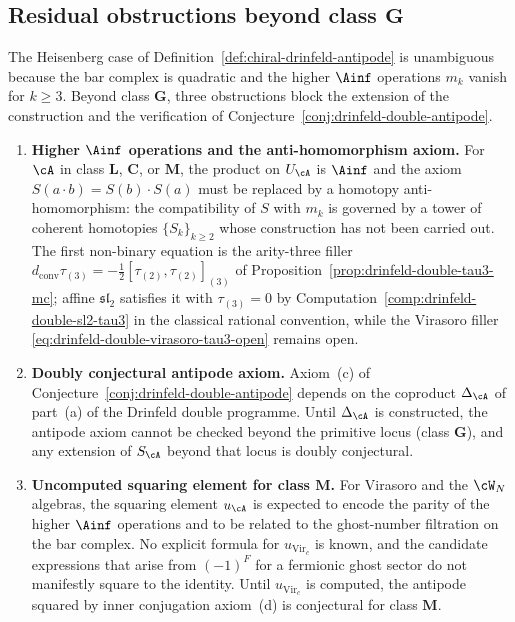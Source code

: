 \subsection{Residual obstructions beyond class $\mathbf{G}$}
\label{subsec:antipode-obstructions}

The Heisenberg case of Definition~\ref{def:chiral-drinfeld-antipode}
is unambiguous because the bar complex is quadratic and the higher
$\Ainf$ operations $m_k$ vanish for $k \ge 3$. Beyond class
$\mathbf{G}$, three obstructions block the extension of the
construction and the verification of Conjecture~\ref{conj:drinfeld-double-antipode}.

\begin{enumerate}
\item \textbf{Higher $\Ainf$ operations and the anti-homomorphism
axiom.} For $\cA$ in class $\mathbf{L}$, $\mathbf{C}$, or
$\mathbf{M}$, the product on $U_\cA$ is $\Ainf$ and the axiom
$S(a \cdot b) = S(b) \cdot S(a)$ must be replaced by a homotopy
anti-homomorphism: the compatibility of $S$ with $m_k$ is governed
by a tower of coherent homotopies $\{S_k\}_{k \ge 2}$ whose
construction has not been carried out. The first non-binary equation
is the arity-three filler
$d_{\mathrm{conv}}\tau_{(3)}
=-\frac12[\tau_{(2)},\tau_{(2)}]_{(3)}$ of
Proposition~\ref{prop:drinfeld-double-tau3-mc}; affine
$\mathfrak{sl}_2$ satisfies it with $\tau_{(3)}=0$ by
Computation~\ref{comp:drinfeld-double-sl2-tau3} in the classical
rational convention, while the Virasoro filler
\eqref{eq:drinfeld-double-virasoro-tau3-open} remains open.
\item \textbf{Doubly conjectural antipode axiom.} Axiom~(c) of
Conjecture~\ref{conj:drinfeld-double-antipode} depends on the
coproduct $\Delta_\cA$ of part~(a) of the Drinfeld double
programme. Until $\Delta_\cA$ is constructed, the antipode axiom
cannot be checked beyond the primitive locus (class $\mathbf{G}$),
and any extension of $S_\cA$ beyond that locus is doubly
conjectural.
\item \textbf{Uncomputed squaring element for class $\mathbf{M}$.}
For Virasoro and the $\cW_N$ algebras, the squaring element
$u_\cA$ is expected to encode the parity of the higher $\Ainf$
operations and to be related to the ghost-number filtration on
the bar complex. No explicit formula for $u_{\mathrm{Vir}_c}$
is known, and the candidate expressions that arise from
$(-1)^{F}$ for a fermionic ghost sector do not manifestly square
to the identity. Until $u_{\mathrm{Vir}_c}$ is computed, the
antipode squared by inner conjugation axiom~(d) is conjectural for class $\mathbf{M}$.
\end{enumerate}

